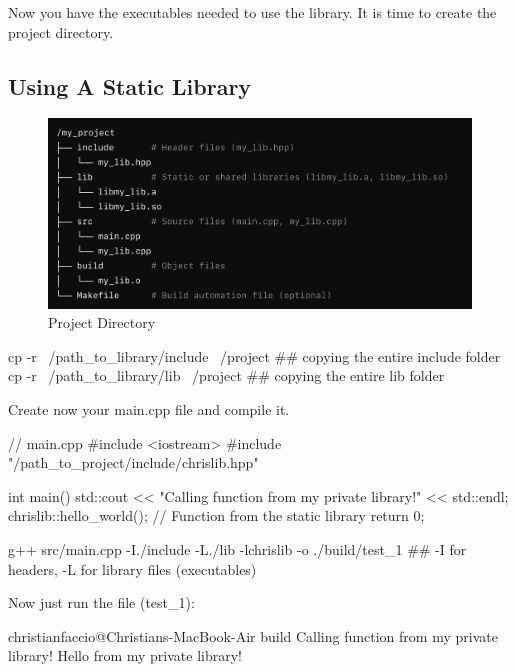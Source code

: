 Now you have the executables needed to use the library. It is time to create the project directory.


\subsection*{Using A Static Library}

\begin{figure}[H]
    \centering
    \includegraphics[width=\textwidth]{assets/static_proj_dir.png}
    \caption{Project Directory}
\end{figure}



\begin{codeblock}[language=bash]
    cp -r ~/path_to_library/include ~/project   ## copying the entire include folder
    cp -r ~/path_to_library/lib ~/project   ## copying the entire lib folder
\end{codeblock}

Create now your main.cpp file and compile it.

\begin{codeblock}[language=C++]
    // main.cpp
    #include <iostream>
    #include "/path_to_project/include/chrislib.hpp"
    
    int main() {
        std::cout << "Calling function from my private library!" << std::endl;
        chrislib::hello_world();  // Function from the static library
        return 0;
    }
\end{codeblock}

\vspace{1cm}
\begin{codeblock}[language=bash]
    g++ src/main.cpp -I./include -L./lib -lchrislib -o ./build/test_1   ## -I for headers, -L for library files (executables)
\end{codeblock}

Now just run the file (test\_1):
\begin{codeblock}[language=bash]
    christianfaccio@Christians-MacBook-Air build %
    Calling function from my private library!
    Hello from my private library!
\end{codeblock}


